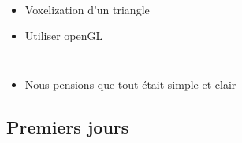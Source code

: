 \begin{frame}[fragile=singleslide]{\insertsectionhead}
  \framesubtitle{\insertsubsectionhead}
  \begin{columns}[T,onlytextwidth]
      \begin{itemize}
        \item Voxelization d'un triangle
        \item Utiliser openGL
      \end{itemize}
      \begin{figure}
        \begin{subfigure}{0.4\textwidth}
        \end{subfigure}
      \end{figure}
  \end{columns}
  \vfill
  \begin{itemize}
    \item Nous pensions que tout était simple et clair
  \end{itemize}
\end{frame}

\subsection{Premiers jours}

